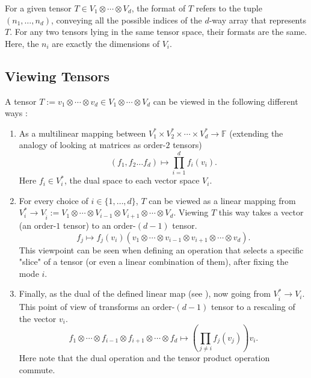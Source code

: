 \documentclass[../Lael_John_MasterThesis_Draft.tex]{subfiles}
\begin{document}
\begin{definition}\label{defn:tensorformat}
    For a given tensor $T \in V_1 \otimes \cdots \otimes V_d$, the format of $T$ refers to the tuple $(n_1, \ldots, n_d)$, conveying all the possible indices of the $d$-way array that represents $T$. For any two tensors lying in the same tensor space, their formats are the same. Here, the $n_i$ are exactly the dimensions of $V_i$.
\end{definition}
\subsection*{Viewing Tensors}
A tensor $T:= v_1 \otimes \cdots \otimes v_d \in V_1 \otimes \cdots \otimes V_d$ can be viewed in the following different ways \cite{landsberg_tensors_2012}: \begin{enumerate}\label{list:viewingtensors}
    \item As a multilinear mapping between $V_1^* \times V_2^* \times \cdots \times V_d^* \to \mathbb{F}$ (extending the analogy of looking at matrices as order-$2$ tensors) $$(f_1, f_2 \ldots f_d) \mapsto \prod_{i=1}^{d} f_i(v_i).$$ Here $f_i \in V_i^*$, the dual space to each vector space $V_i$.
    \item For every choice of $i\in \{1, \ldots, d\}$, $T$ can be viewed as a linear mapping from $V_i^* \to V_{\hat{i}} := V_1 \otimes \cdots \otimes V_{i-1} \otimes V_{i+1} \otimes \cdots \otimes V_d$. Viewing $T$ this way takes a vector (an order-$1$ tensor) to an order-$(d-1)$ tensor. \begin{equation}\label{eqn:tensormappingdroporder}
        f_j \mapsto f_j(v_i)(v_1 \otimes \cdots \otimes v_{i-1}\otimes v_{i+1} \otimes \cdots \otimes v_d).
    \end{equation}
    This viewpoint can be seen when defining an operation that selects a specific "slice" of a tensor (or even a linear combination of them), after fixing the mode $i$.
    \item Finally, as the dual of the defined linear map (see ), now going from $V_{\hat{i}}^* \to V_i$. This point of view of transforms an order-$(d-1)$ tensor to a rescaling of the vector $v_i$. $$f_1 \otimes \cdots \otimes f_{i-1} \otimes f_{i+1} \otimes \cdots \otimes f_d \mapsto \left(\prod_{j \neq i} f_j(v_j)\right)v_i.$$Here note that the dual operation and the tensor product operation commute.
\end{enumerate}
\end{document}
